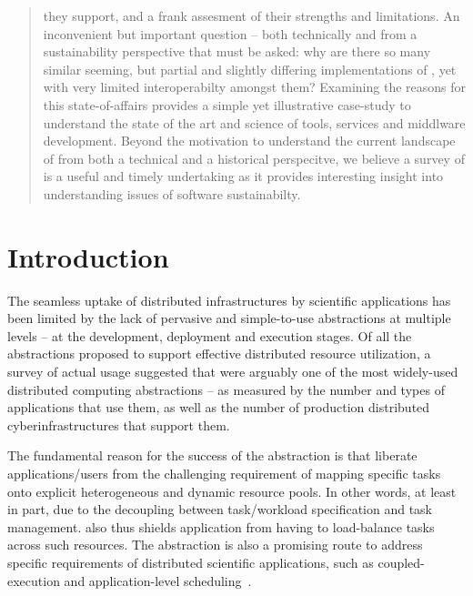 \documentclass{sig-alternate}
\begin{document}
\begin{abstract}
  they support, and a frank assesment of their strengths and
  limitations.  An inconvenient but important question -- both
  technically and from a sustainability perspective that must be
  asked: why are there so many similar seeming, but partial and
  slightly differing implementations of \pilotjobs, yet with very
  limited interoperabilty amongst them?  Examining the reasons for
  this state-of-affairs provides a simple yet illustrative case-study
  to understand the state of the art and science of tools, services
  and middlware development.  Beyond the motivation to understand the
  current landscape of \pilotjobs from both a technical and a
  historical perspecitve, we believe a survey of \pilotjobs is a
  useful and timely undertaking as it provides interesting insight
  into understanding issues of software sustainabilty.
\end{abstract}

\section{Introduction} 

  
The seamless uptake of distributed infrastructures by scientific
applications has been limited by the lack of pervasive and
simple-to-use abstractions at multiple levels – at the development,
deployment and execution stages. Of all the abstractions proposed to
support effective distributed resource utilization, a survey of actual
usage suggested that \pilotjobs were arguably one of the most
widely-used distributed computing abstractions – as measured by the
number and types of applications that use them, as well as the number
of production distributed cyberinfrastructures that support them.


The fundamental reason for the success of the \pilotjob abstraction is
that \pilotjob liberate applications/users from the challenging
requirement of mapping specific tasks onto explicit heterogeneous and
dynamic resource pools.  In other words, at least in part, due to the
decoupling between task/workload specification and task management.
\pilotjobs also thus shields application from having to load-balance
tasks across such resources.  The \pilotjob abstraction is also a
promising route to address specific requirements of distributed
scientific applications, such as coupled-execution and
application-level scheduling~\cite{ko-
  efficient,DBLP:conf/hpdc/KimHMAJ10}.
\end{document}

